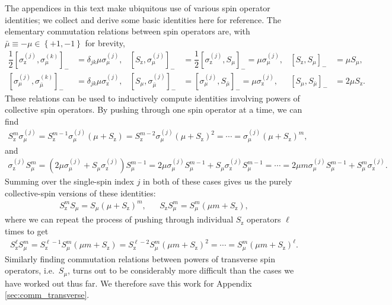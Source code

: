 \documentclass[aps,notitlepage,nofootinbib,11pt]{revtex4-1}
\newcommand{\f}[2]{\dfrac{#1}{#2}} %
\newcommand{\p}[1]{\left(#1\right)} %
\renewcommand{\sp}[1]{\left[#1\right]} %
\renewcommand{\set}[1]{\left\{#1\right\}} %
\newcommand{\z}{\text{z}}
\newcommand{\bmu}{{\bar\mu}}
\newcommand{\1}{\mathds{1}}
\begin{document}
The appendices in this text make ubiquitous use of various spin
operator identities; we collect and derive some basic identities here
for reference.  The elementary commutation relations between spin
operators are, with $\bmu\equiv-\mu\in\set{+1,-1}$ for brevity,
\begin{align}
  \f12 \sp{\sigma_\z^{(j)},\sigma_\mu^{(k)}}_-
  &= \delta_{jk} \mu \sigma_\mu^{(j)},
  &
  \sp{S_\z,\sigma_\mu^{(j)}}_-
  &= \f12 \sp{\sigma_\z^{(j)},S_\mu}_- = \mu \sigma_\mu^{(j)},
  &
  \sp{S_\z,S_\mu}_-
  &= \mu S_\mu,
  \label{eq:comm_z_base} \\
  \sp{\sigma_\mu^{(j)},\sigma_\bmu^{(k)}}_-
  &= \delta_{jk} \mu \sigma_\z^{(j)},
  &
  \sp{S_\mu,\sigma_\bmu^{(j)}}_-
  &= \sp{\sigma_\mu^{(j)},S_\bmu}_- = \mu \sigma_\z^{(j)},
  &
  \sp{S_\mu,S_\bmu}_-
  &= 2 \mu S_\z.
  \label{eq:comm_mu_base}
\end{align}
These relations can be used to inductively compute identities
involving powers of collective spin operators.  By pushing through one
spin operator at a time, we can find
\begin{align}
  S_\z^m \sigma_\mu^{(j)}
  = S_\z^{m-1} \sigma_\mu^{(j)} \p{\mu + S_\z}
  = S_\z^{m-2} \sigma_\mu^{(j)} \p{\mu + S_\z}^2
  = \cdots
  = \sigma_\mu^{(j)} \p{\mu + S_\z}^m,
  \label{eq:push_z_mu_Ss}
\end{align}
and
\begin{align}
  \sigma_\z^{(j)} S_\mu^m
  = \p{2\mu\sigma_\mu^{(j)} + S_\mu \sigma_\z^{(j)}} S_\mu^{m-1}
  = 2\mu\sigma_\mu^{(j)} S_\mu^{m-1} + S_\mu \sigma_\z^{(j)} S_\mu^{m-1}
  = \cdots
  = 2\mu m\sigma_\mu^{(j)} S_\mu^{m-1} + S_\mu^m \sigma_\z^{(j)}.
  \label{eq:push_z_mu_sS}
\end{align}
Summing over the single-spin index $j$ in both of these cases gives us
the purely collective-spin versions of these identities:
\begin{align}
  S_\z^m S_\mu = S_\mu \p{\mu + S_\z}^m,
  &&
  S_\z S_\mu^m = S_\mu^m \p{\mu m + S_\z},
  \label{eq:push_z_mu_single}
\end{align}
where we can repeat the process of pushing through individual $S_\z$
operators $\ell$ times to get
\begin{align}
  S_\z^\ell S_\mu^m
  = S_\z^{\ell-1} S_\mu^m \p{\mu m + S_\z}
  = S_\z^{\ell-2} S_\mu^m \p{\mu m + S_\z}^2
  = \cdots
  = S_\mu^m \p{\mu m + S_\z}^\ell.
  \label{eq:push_z_mu}
\end{align}
Similarly finding commutation relations between powers of transverse
spin operators, i.e.~$S_\mu$, turns out to be considerably more
difficult than the cases we have worked out thus far.  We therefore
save this work for Appendix \ref{sec:comm_transverse}.
\end{document}
